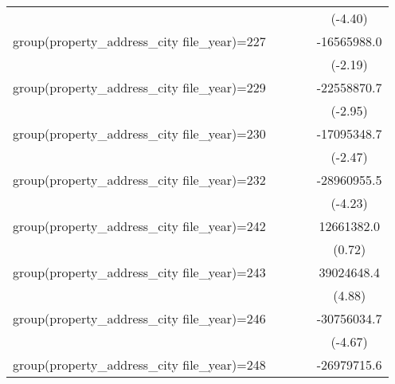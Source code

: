 {\begin{tabular}{l*{4}{c}}
                    &                     &                     &                     &     (-4.40)         \\
\addlinespace
group(property\_address\_city file\_year)=227&                     &                     &                     & -16565988.0\sym{*}  \\
                    &                     &                     &                     &     (-2.19)         \\
\addlinespace
group(property\_address\_city file\_year)=229&                     &                     &                     & -22558870.7\sym{**} \\
                    &                     &                     &                     &     (-2.95)         \\
\addlinespace
group(property\_address\_city file\_year)=230&                     &                     &                     & -17095348.7\sym{*}  \\
                    &                     &                     &                     &     (-2.47)         \\
\addlinespace
group(property\_address\_city file\_year)=232&                     &                     &                     & -28960955.5\sym{***}\\
                    &                     &                     &                     &     (-4.23)         \\
\addlinespace
group(property\_address\_city file\_year)=242&                     &                     &                     &  12661382.0         \\
                    &                     &                     &                     &      (0.72)         \\
\addlinespace
group(property\_address\_city file\_year)=243&                     &                     &                     &  39024648.4\sym{***}\\
                    &                     &                     &                     &      (4.88)         \\
\addlinespace
group(property\_address\_city file\_year)=246&                     &                     &                     & -30756034.7\sym{***}\\
                    &                     &                     &                     &     (-4.67)         \\
\addlinespace
group(property\_address\_city file\_year)=248&                     &                     &                     & -26979715.6\sym{***}\\

\end{tabular}}

